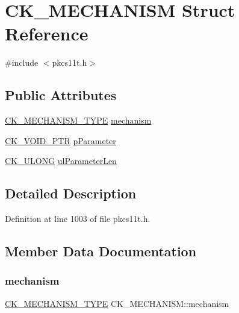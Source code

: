 \hypertarget{struct_c_k___m_e_c_h_a_n_i_s_m}{}\section{C\+K\+\_\+\+M\+E\+C\+H\+A\+N\+I\+SM Struct Reference}
\label{struct_c_k___m_e_c_h_a_n_i_s_m}


{\ttfamily \#include $<$pkcs11t.\+h$>$}

\subsection*{Public Attributes}
\begin{DoxyCompactItemize}
\item 
\hyperlink{pkcs11t_8h_aaf1084907f5cc09a3e0b85ab022a240d}{C\+K\+\_\+\+M\+E\+C\+H\+A\+N\+I\+S\+M\+\_\+\+T\+Y\+PE} \hyperlink{struct_c_k___m_e_c_h_a_n_i_s_m_a9184d5862b90646ed36cab61a9102d7a}{mechanism}
\item 
\hyperlink{pkcs11t_8h_ace49359127edfc5665608140005b9a96}{C\+K\+\_\+\+V\+O\+I\+D\+\_\+\+P\+TR} \hyperlink{struct_c_k___m_e_c_h_a_n_i_s_m_a1653492fcd85698632f51f84596eb743}{p\+Parameter}
\item 
\hyperlink{pkcs11t_8h_a35181858a3b7a0a81f49d180d8f446ef}{C\+K\+\_\+\+U\+L\+O\+NG} \hyperlink{struct_c_k___m_e_c_h_a_n_i_s_m_a47eeb17fc7cb3daac0e297c9af360798}{ul\+Parameter\+Len}
\end{DoxyCompactItemize}


\subsection{Detailed Description}


Definition at line 1003 of file pkcs11t.\+h.



\subsection{Member Data Documentation}
\mbox{\label{struct_c_k___m_e_c_h_a_n_i_s_m_a9184d5862b90646ed36cab61a9102d7a}} 
\subsubsection{\texorpdfstring{mechanism}{mechanism}}
{\footnotesize\ttfamily \hyperlink{pkcs11t_8h_aaf1084907f5cc09a3e0b85ab022a240d}{C\+K\+\_\+\+M\+E\+C\+H\+A\+N\+I\+S\+M\+\_\+\+T\+Y\+PE} C\+K\+\_\+\+M\+E\+C\+H\+A\+N\+I\+S\+M\+::mechanism}



